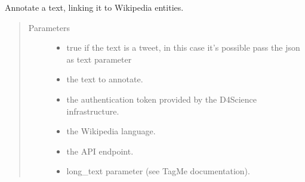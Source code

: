 \documentclass[letterpaper,10pt,english]{sphinxmanual}
\begin{document}
\begin{fulllineitems}
\label{\detokenize{code_comment/tweet_processor:hate_tweet_map.tweets_processor.MyTagMe.annotate}}
\sphinxAtStartPar
Annotate a text, linking it to Wikipedia entities.
\begin{quote}\begin{description}
\item[{Parameters}] \leavevmode\begin{itemize}
\item {} 
\sphinxAtStartPar
{} \textendash{} true if the text is a tweet, in this case it’s possible pass the json as text parameter

\item {} 
\sphinxAtStartPar
{} \textendash{} the text to annotate.

\item {} 
\sphinxAtStartPar
{} \textendash{} the authentication token provided by the D4Science infrastructure.

\item {} 
\sphinxAtStartPar
{} \textendash{} the Wikipedia language.

\item {} 
\sphinxAtStartPar
{} \textendash{} the API endpoint.

\item {} 
\sphinxAtStartPar
{} \textendash{} long\_text parameter (see TagMe documentation).

\end{itemize}

\end{description}\end{quote}

\end{fulllineitems}
\end{document}
